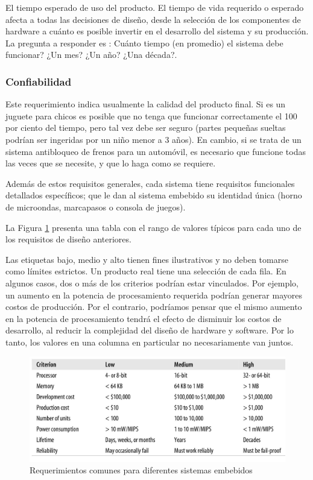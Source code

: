 \documentclass[output=paper, 
colorlinks,
citecolor=brown,
newtxmath
]{langscibook}
\begin{document}
El tiempo esperado de uso del producto. El tiempo de vida requerido o esperado
afecta a todas las decisiones de diseño, desde la selección de los componentes
de hardware a cuánto es posible invertir en el desarrollo del sistema y su 
producción. La pregunta a responder es : Cuánto tiempo (en promedio) el sistema
debe funcionar? ¿Un mes? ¿Un año? ¿Una década?.



\subsubsection *{Confiabilidad}

Este requerimiento indica usualmente la calidad del producto final. 
Si es un juguete para chicos es posible que no tenga que funcionar correctamente el 100 por 
ciento del tiempo, pero tal vez debe ser seguro (partes pequeñas sueltas podrían ser ingeridas por 
un niño menor a 3 años). En cambio, si se trata de un sistema antibloqueo 
de frenos para un automóvil, es necesario que funcione todas las veces
que se necesite, y que lo haga como se requiere.

Además de estos requisitos generales, cada sistema tiene requisitos funcionales 
detallados específicos; que le dan al sistema embebido su identidad única (horno de microondas, marcapasos o consola de juegos).

La Figura \ref{fig:tabla-rango} presenta una tabla con el rango de valores típicos para cada uno de los requisitos de diseño anteriores. 

Las etiquetas bajo, medio y alto tienen fines ilustrativos y no deben tomarse como límites estrictos. 
Un producto real tiene una selección de cada fila. En algunos casos, dos o más de los criterios 
podrían estar vinculados. Por ejemplo, un aumento en la potencia de procesamiento 
requerida podrían generar mayores costos de producción. 
Por el contrario, podríamos pensar que el mismo aumento en la potencia de 
procesamiento tendrá el efecto de disminuir los costos de desarrollo, 
al reducir la complejidad del diseño de hardware y software. 
Por lo tanto, los valores en una columna en particular no necesariamente van juntos.


\begin{figure}
\includegraphics[scale=0.25]{images/requerimientos-comunes.jpg}
\caption{Requerimientos comunes para diferentes sistemas embebidos}
\label{fig:tabla-rango}
\end{figure}
\end{document}

